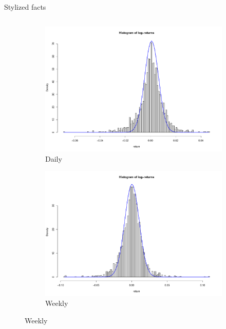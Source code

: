 \documentclass{beamer} %
\begin{document}
\begin{frame}{Stylized facts}
\begin{columns}
\begin{column}{.5\textwidth}
			\begin{figure}[hbtp]
				\begin{subfigure}{.5\textwidth}
					\includegraphics[scale=.11]
					{../Draft/img/finData/histDailyLogRet}
					\caption{Daily}
				\end{subfigure}%
				\begin{subfigure}{.5\textwidth}
					\centering
					\includegraphics[scale=.11]
					{../Draft/img/finData/histWeeklyLogRet}
					\caption{Weekly}
				\end{subfigure}
				

\end{figure}
\end{column}
\end{columns}
\end{frame}
\end{document}
